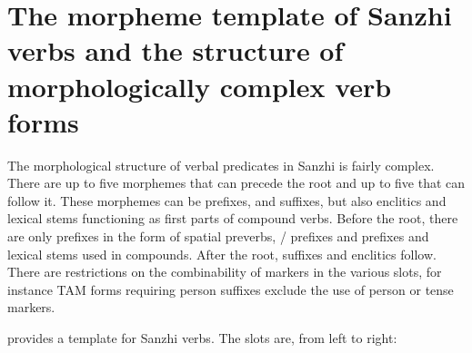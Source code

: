 
\section[The morpheme template of Sanzhi verbs]{The morpheme template of Sanzhi verbs and the structure of morphologically complex verb forms}
\label{sec:The morpheme template of Sanzhi verbs and the structure of morphologically complex verb forms}

The morphological structure of verbal predicates in Sanzhi is fairly complex. There are up to five morphemes that can precede the root and up to five that can follow it. These morphemes can be prefixes, and suffixes, but also enclitics and lexical stems functioning as first parts of compound verbs. Before the root, there are only prefixes in the form of spatial preverbs, / prefixes and  prefixes and lexical stems used in compounds. After the root, suffixes and enclitics follow. There are restrictions on the combinability of markers in the various slots, for instance TAM forms requiring person suffixes exclude the use of  person or tense markers.

 provides a template for Sanzhi verbs. The slots are, from left to right:\largerpage

